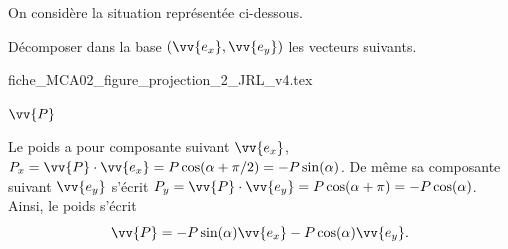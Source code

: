 On considère la situation représentée ci-dessous.

Décomposer dans la base $(\vv{e_x}, \vv{e_y})$ les vecteurs suivants.
\begin{center}
{fiche_MCA02_figure_projection_2_JRL_v4.tex}
\end{center}

\medskip


\debutEntrainement

\begin{enonce}
	$\vv{P}$
\end{enonce}


\begin{corrige}
Le poids a pour composante suivant $\vv{e_x}$, $P_x=\vv{P}\cdot \vv{e_x}=P\cos(\alpha+\pi/2)=-P\sin(\alpha)$. De même sa composante suivant $\vv{e_y}$ s'écrit $P_y=\vv{P}\cdot \vv{e_y}=P\cos(\alpha+\pi)=-P\cos(\alpha)$. Ainsi, le poids s'écrit 
\[
\vv{P} = - P \sin(\alpha)\vv{e_x} - P \cos (\alpha) \vv{e_y}.
\]
\end{corrige}

